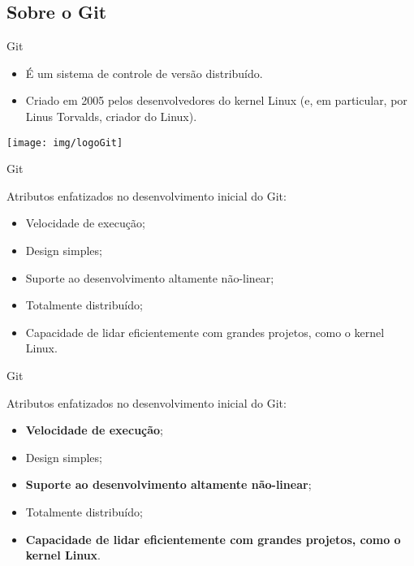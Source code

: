 \documentclass[a4paper]{beamer}
\begin{document}
\subsection{Sobre o Git}

\begin{frame}{Git}

\begin{itemize}
\item É um sistema de controle de versão distribuído.
\item Criado em 2005 pelos desenvolvedores do kernel Linux (e, em particular, por Linus Torvalds, criador do Linux).
\end{itemize}

\vspace{20pt}
\begin{center}
\texttt{[image: img/logoGit]}
\end{center}

\end{frame}

\begin{frame}{Git}

Atributos enfatizados no desenvolvimento inicial do Git:
\begin{itemize}
\item Velocidade de execução;
\item Design simples;
\item Suporte ao desenvolvimento altamente não-linear;
\item Totalmente distribuído;
\item Capacidade de lidar eficientemente com grandes projetos, como o kernel Linux.
\end{itemize}

\end{frame}

\begin{frame}{Git}

Atributos enfatizados no desenvolvimento inicial do Git:
\begin{itemize}
\item \textbf{Velocidade de execução};
\item Design simples;
\item \textbf{Suporte ao desenvolvimento altamente não-linear};
\item Totalmente distribuído;
\item \textbf{Capacidade de lidar eficientemente com grandes projetos, como o kernel Linux}.
\end{itemize}

\end{frame}
\end{document}
